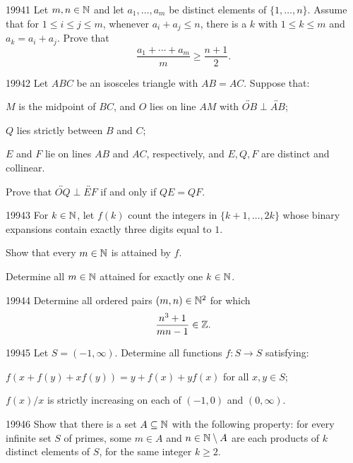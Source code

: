 
\begin{problem}{1994}{1}
Let $m, n\in\mathbb{N}$ and let $a_1, \dots, a_m$ be distinct elements of $\{1, \dots, n\}$. Assume that for $1\leq i\leq j\leq m$, whenever $a_i+a_j\leq n$, there is a $k$ with $1\leq k\leq m$ and $a_k=a_i+a_j$. Prove that
\[
    \frac{a_1+\cdots+a_m}{m}\geq\frac{n+1}{2}.
\]
\end{problem}

\begin{problem}{1994}{2}
Let $ABC$ be an isosceles triangle with $AB=AC$. Suppose that:
\begin{problemclauses}
    \item $M$ is the midpoint of $BC$, and $O$ lies on line $AM$ with $\overleftrightarrow{OB}\perp\overleftrightarrow{AB}$;
    \item $Q$ lies strictly between $B$ and $C$;
    \item $E$ and $F$ lie on lines $AB$ and $AC$, respectively, and $E, Q, F$ are distinct and collinear.
\end{problemclauses}
Prove that $\overleftrightarrow{OQ}\perp\overleftrightarrow{EF}$ if and only if $QE=QF$.
\end{problem}

\begin{problem}{1994}{3}
For $k\in\mathbb{N}$, let $f(k)$ count the integers in $\{k+1, \dots, 2k\}$ whose binary expansions contain exactly three digits equal to $1$.
\begin{problemsubparts}
    \item Show that every $m\in\mathbb{N}$ is attained by $f$.
    \item Determine all $m\in\mathbb{N}$ attained for exactly one $k\in\mathbb{N}$.
\end{problemsubparts}
\end{problem}

\begin{problem}{1994}{4}
Determine all ordered pairs $(m, n)\in\mathbb{N}^2$ for which
\[
    \frac{n^3+1}{mn-1}\in\mathbb{Z}.
\]
\end{problem}

\begin{problem}{1994}{5}
Let $S=(-1, \infty)$. Determine all functions $f\colon S\to S$ satisfying:
\begin{problemclauses}
    \item $f(x+f(y)+xf(y))=y+f(x)+yf(x)$ for all $x, y\in S$;
    \item $f(x)/x$ is strictly increasing on each of $(-1, 0)$ and $(0, \infty)$.
\end{problemclauses}
\end{problem}

\begin{problem}{1994}{6}
Show that there is a set $A\subseteq\mathbb{N}$ with the following property: for every infinite set $S$ of primes, some $m\in A$ and $n\in\mathbb{N}\setminus A$ are each products of $k$ distinct elements of $S$, for the same integer $k\geq2$.
\end{problem}
